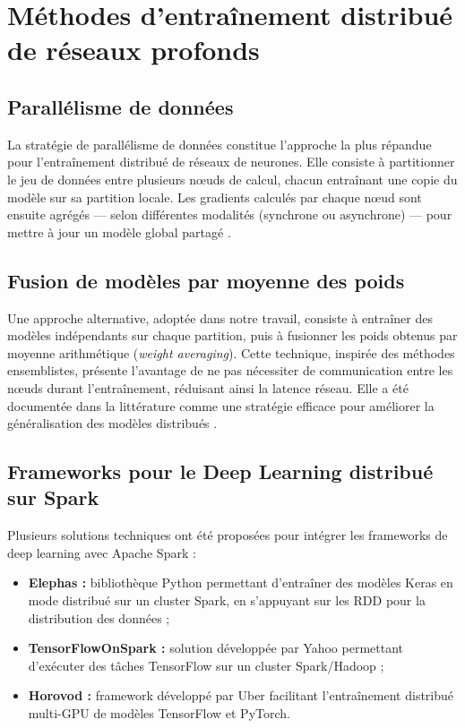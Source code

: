 \documentclass[12pt,a4paper]{report}
\begin{document}
\section{Méthodes d'entraînement distribué de réseaux profonds}

\subsection{Parallélisme de données}

La stratégie de parallélisme de données constitue l'approche la plus répandue pour
l'entraînement distribué de réseaux de neurones. Elle consiste à partitionner le jeu
de données entre plusieurs nœuds de calcul, chacun entraînant une copie du modèle sur
sa partition locale. Les gradients calculés par chaque nœud sont ensuite agrégés ---
selon différentes modalités (synchrone ou asynchrone) --- pour mettre à jour un
modèle global partagé \cite{dean2008}.

\subsection{Fusion de modèles par moyenne des poids}

Une approche alternative, adoptée dans notre travail, consiste à entraîner des
modèles indépendants sur chaque partition, puis à fusionner les poids obtenus par
moyenne arithmétique (\textit{weight averaging}). Cette technique, inspirée des
méthodes ensemblistes, présente l'avantage de ne pas nécessiter de communication
entre les nœuds durant l'entraînement, réduisant ainsi la latence réseau. Elle a été
documentée dans la littérature comme une stratégie efficace pour améliorer la
généralisation des modèles distribués \cite{goodfellow2016}.

\subsection{Frameworks pour le Deep Learning distribué sur Spark}

Plusieurs solutions techniques ont été proposées pour intégrer les frameworks de deep
learning avec Apache Spark :

\begin{itemize}
  \item \textbf{Elephas :} bibliothèque Python permettant d'entraîner des modèles
    Keras en mode distribué sur un cluster Spark, en s'appuyant sur les \acs{RDD}
    pour la distribution des données ;
  \item \textbf{TensorFlowOnSpark :} solution développée par Yahoo permettant
    d'exécuter des tâches TensorFlow sur un cluster Spark/Hadoop \cite{abadi2016} ;
  \item \textbf{Horovod :} framework développé par Uber facilitant l'entraînement
    distribué multi-GPU de modèles TensorFlow et PyTorch.
\end{itemize}
\end{document}
